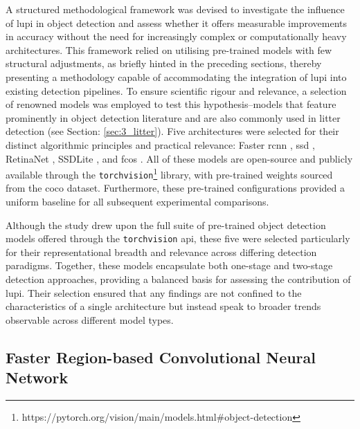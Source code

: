 A structured methodological framework was devised to investigate the influence of \gls{lupi} in object detection and assess whether it offers measurable improvements in accuracy without the need for increasingly complex or computationally heavy architectures. This framework relied on utilising pre-trained models with few structural adjustments, as briefly hinted in the preceding sections, thereby presenting a methodology capable of accommodating the integration of \gls{lupi} into existing detection pipelines.
To ensure scientific rigour and relevance, a selection of renowned models was employed to test this hypothesis--models that feature prominently in object detection literature and are also commonly used in litter detection (see Section: \ref{sec:3_litter}). Five architectures were selected for their distinct algorithmic principles and practical relevance: Faster \gls{rcnn} \cite{rcnn}, \gls{ssd} \cite{ssd}, RetinaNet \cite{retinanet}, SSDLite \cite{ssdlite}, and \gls{fcos} \cite{fcos}. All of these models are open-source and publicly available through the \verb|torchvision|\footnote{https://pytorch.org/vision/main/models.html\#object-detection} library, with pre-trained weights sourced from the \gls{coco} dataset. Furthermore, these pre-trained configurations provided a uniform baseline for all subsequent experimental comparisons.

Although the study drew upon the full suite of pre-trained object detection models offered through the \verb|torchvision| \gls{api}, these five were selected particularly for their representational breadth and relevance across differing detection paradigms. Together, these models encapsulate both one-stage and two-stage detection approaches, providing a balanced basis for assessing the contribution of \gls{lupi}. Their selection ensured that any findings are not confined to the characteristics of a single architecture but instead speak to broader trends observable across different model types.

\subsection{Faster Region-based Convolutional Neural Network}
\label{subsec:4_fastercnn}

